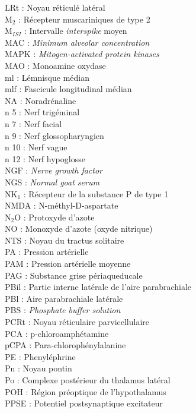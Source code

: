 \documentclass[a4paper,12pt,twoside]{report}
\begin{document}
\begin{singlespacing}
\begin{multicols}{2}
LRt : Noyau réticulé latéral\\
M$_{2}$ : Récepteur muscariniques de type 2\\
M$_{ISI}$ : Intervalle \textit{interspike} moyen\\
MAC : \textit{Minimum alveolar concentration}\\
MAPK : \textit{Mitogen-activated protein kinases}\\
MAO : Monoamine oxydase\\
ml : Lémnisque médian\\
mlf : Fascicule longitudinal médian\\
NA : Noradrénaline\\
n 5 : Nerf trigéminal\\
n 7 : Nerf facial\\
n 9 : Nerf glossopharyngien\\
n 10 : Nerf vague\\
n 12 : Nerf hypoglosse\\
NGF : \textit{Nerve growth factor}\\
NGS : \textit{Normal goat serum}\\
NK$_{1}$ : Récepteur de la substance P de type 1\\
NMDA : N-méthyl-D-aspartate\\
N$_{2}$O : Protoxyde d’azote\\
NO : Monoxyde d’azote (oxyde nitrique)\\
NTS : Noyau du tractus solitaire\\
PA : Pression artérielle\\
PAM : Pression artérielle moyenne\\
PAG : Substance grise périaqueducale\\
PBil : Partie interne latérale de l’aire parabrachiale\\
PBl : Aire parabrachiale latérale\\
PBS : \textit{Phosphate buffer solution}\\
PCRt : Noyau réticulaire parvicellulaire\\
PCA : p-chloroamphétamine\\
pCPA : Para-chlorophénylalanine\\
PE : Phenyléphrine\\
Pn : Noyau pontin\\
Po : Complexe postérieur du thalamus latéral\\
POH : Région préoptique de l’hypothalamus\\
PPSE : Potentiel postsynaptique excitateur\\

\end{multicols}
\end{singlespacing}
\end{document}
